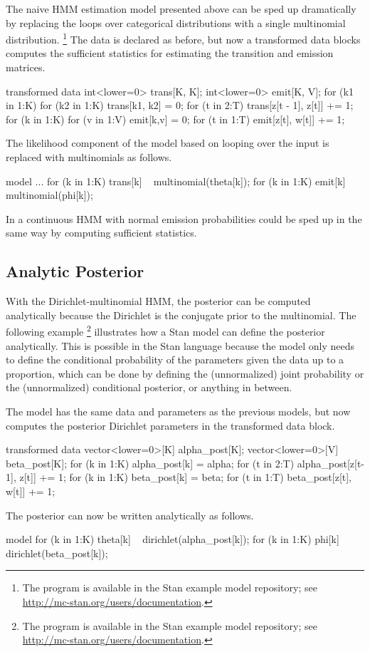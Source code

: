 The naive HMM estimation model presented above can be sped up
dramatically by replacing the loops over categorical distributions
with a single multinomial distribution.%
%
\footnote{The program is available in the Stan example model repository;
see \url{http://mc-stan.org/users/documentation}.}
%
The data is declared as before, but now a transformed data blocks
computes the sufficient statistics for estimating the transition and
emission matrices.
%
\begin{stancode}
transformed data {
  int<lower=0> trans[K, K];
  int<lower=0> emit[K, V];
  for (k1 in 1:K)
    for (k2 in 1:K)
      trans[k1, k2] = 0;
  for (t in 2:T)
    trans[z[t - 1], z[t]] += 1;
  for (k in 1:K)
    for (v in 1:V)
      emit[k,v] = 0;
  for (t in 1:T)
    emit[z[t], w[t]] += 1;
}
\end{stancode}
%
The likelihood component of the model based on looping over the input
is replaced with multinomials as follows.
%
\begin{stancode}
model {
  ...
  for (k in 1:K)
    trans[k] ~ multinomial(theta[k]);
  for (k in 1:K)
    emit[k] ~ multinomial(phi[k]);
}
\end{stancode}
%
In a continuous HMM with normal emission probabilities could be sped
up in the same way by computing sufficient statistics.

\subsection{Analytic Posterior}

With the Dirichlet-multinomial HMM, the posterior can be computed
analytically because the Dirichlet is the conjugate prior to the
multinomial.  The following example%
%
\footnote{The program is available in the Stan example model repository;
see \url{http://mc-stan.org/users/documentation}.}
%
illustrates how a Stan model can define the posterior analytically.
This is possible in the Stan language because the model only needs to
define the conditional probability of the parameters given the data up
to a proportion, which can be done by defining the (unnormalized)
joint probability or the (unnormalized) conditional posterior, or
anything in between.

The model has the same data and parameters as the previous models, but
now computes the posterior Dirichlet parameters in the transformed
data block.
%
\begin{stancode}
transformed data {
  vector<lower=0>[K] alpha_post[K];
  vector<lower=0>[V] beta_post[K];
  for (k in 1:K)
    alpha_post[k] = alpha;
  for (t in 2:T)
    alpha_post[z[t-1], z[t]] += 1;
  for (k in 1:K)
    beta_post[k] = beta;
  for (t in 1:T)
    beta_post[z[t], w[t]] += 1;
}
\end{stancode}
%
The posterior can now be written analytically as follows.
%
\begin{stancode}
model {
  for (k in 1:K)
    theta[k] ~ dirichlet(alpha_post[k]);
  for (k in 1:K)
    phi[k] ~ dirichlet(beta_post[k]);
}
\end{stancode}


